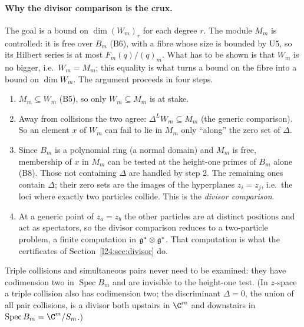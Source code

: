 \paragraph{Why the divisor comparison is the crux.} The goal is a bound on $\dim(W_m)_r$ for each degree $r$. The
module $M_m$ is controlled: it is free over $B_m$ (B6), with a fibre whose size is bounded by U5, so its Hilbert series
is at most $F_m(q)/(q)_m$. What has to be shown is that $W_m$ is no bigger, i.e.\ $W_m=M_m$; this equality is what turns
a bound on the fibre into a bound on $\dim W_m$. The argument proceeds in four steps.
\begin{enumerate}
\item $M_m\subseteq W_m$ (B5), so only $W_m\subseteq M_m$ is at stake.
\item Away from collisions the two agree: $\Delta^LW_m\subseteq M_m$ (the generic comparison). So an element $x$ of $W_m$
  can fail to lie in $M_m$ only ``along'' the zero set of $\Delta$.
\item Since $B_m$ is a polynomial ring (a normal domain) and $M_m$ is free, membership of $x$ in $M_m$ can be tested at the
  height-one primes of $B_m$ alone (B8). Those not containing $\Delta$ are handled by step 2. The remaining ones contain
  $\Delta$; their zero sets are the images of the hyperplanes $z_i=z_j$, i.e.\ the loci where exactly two particles
  collide. This is the \emph{divisor comparison}.
\item At a generic point of $z_a=z_b$ the other particles are at distinct positions and act as spectators, so the
  divisor comparison reduces to a two-particle problem, a finite computation in $\mathfrak g^*\otimes\mathfrak g^*$.
  That computation is what the certificates of Section~\ref{l24:sec:divisor} do.
\end{enumerate}
Triple collisions and simultaneous pairs never need to be examined: they have codimension two in $\operatorname{Spec}B_m$
and are invisible to the height-one test. (In $z$-space a triple collision also has codimension two; the discriminant
$\Delta=0$, the union of all pair collisions, is a divisor both upstairs in $\C^m$ and downstairs in
$\operatorname{Spec}B_m=\C^m/S_m$.)

